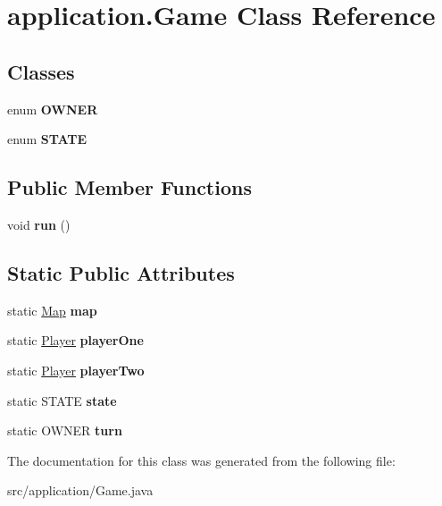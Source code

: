 \hypertarget{classapplication_1_1_game}{\section{application.\+Game Class Reference}
\label{classapplication_1_1_game}
}
\subsection*{Classes}
\begin{DoxyCompactItemize}
\item 
enum {\bfseries O\+W\+N\+E\+R}
\item 
enum {\bfseries S\+T\+A\+T\+E}
\end{DoxyCompactItemize}
\subsection*{Public Member Functions}
\begin{DoxyCompactItemize}
\item 
\hypertarget{classapplication_1_1_game_a35f63ec92d69c27a46171e54477a4783}{void {\bfseries run} ()}\label{classapplication_1_1_game_a35f63ec92d69c27a46171e54477a4783}

\end{DoxyCompactItemize}
\subsection*{Static Public Attributes}
\begin{DoxyCompactItemize}
\item 
\hypertarget{classapplication_1_1_game_a10619b2e871df9e6de819b032cbe1a4d}{static \hyperlink{classapplication_1_1_map}{Map} {\bfseries map}}\label{classapplication_1_1_game_a10619b2e871df9e6de819b032cbe1a4d}

\item 
\hypertarget{classapplication_1_1_game_a08866c12070f0ef544abd8b9f1b6b0e5}{static \hyperlink{classapplication_1_1_player}{Player} {\bfseries player\+One}}\label{classapplication_1_1_game_a08866c12070f0ef544abd8b9f1b6b0e5}

\item 
\hypertarget{classapplication_1_1_game_a31fcad6171766180e0eef67f71253532}{static \hyperlink{classapplication_1_1_player}{Player} {\bfseries player\+Two}}\label{classapplication_1_1_game_a31fcad6171766180e0eef67f71253532}

\item 
\hypertarget{classapplication_1_1_game_adb74b89e0a6424ebcd5c5c13bb569e0c}{static S\+T\+A\+T\+E {\bfseries state}}\label{classapplication_1_1_game_adb74b89e0a6424ebcd5c5c13bb569e0c}

\item 
\hypertarget{classapplication_1_1_game_ad90cfa46ef32022357de71db5f1f7184}{static O\+W\+N\+E\+R {\bfseries turn}}\label{classapplication_1_1_game_ad90cfa46ef32022357de71db5f1f7184}

\end{DoxyCompactItemize}


The documentation for this class was generated from the following file\+:\begin{DoxyCompactItemize}
\item 
src/application/Game.\+java\end{DoxyCompactItemize}
